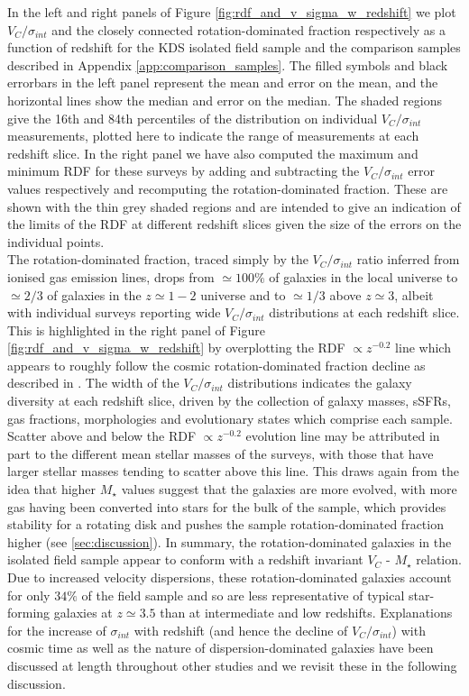 \documentclass[fleqn,usenatbib]{mn2e}
\begin{document}
In the left and right panels of Figure \ref{fig:rdf_and_v_sigma_w_redshift} we plot $V_{C}/\sigma_{int}$ and the closely connected rotation-dominated fraction respectively as a function of redshift for the KDS isolated field sample and the comparison samples described in Appendix \ref{app:comparison_samples}.
The filled symbols and black errorbars in the left panel represent the mean and error on the mean, and the horizontal lines show the median and error on the median.
The shaded regions give the 16th and 84th percentiles of the distribution on individual $V_{C}/\sigma_{int}$ measurements, plotted here to indicate the range of measurements at each redshift slice.
In the right panel we have also computed the maximum and minimum RDF for these surveys by adding and subtracting the $V_{C}/\sigma_{int}$ error values respectively and recomputing the rotation-dominated fraction.
These are shown with the thin grey shaded regions and are intended to give an indication of the limits of the RDF at different redshift slices given the size of the errors on the individual points.\\

The rotation-dominated fraction, traced simply by the $V_{C}/\sigma_{int}$ ratio inferred from ionised gas emission lines, drops from $\simeq100\%$ of galaxies in the local universe to $\simeq2/3$ of galaxies in the $z\simeq1-2$ universe and to $\simeq1/3$ above $z\simeq3$, albeit with individual surveys reporting wide $V_{C}/\sigma_{int}$ distributions at each redshift slice.
This is highlighted in the right panel of Figure \ref{fig:rdf_and_v_sigma_w_redshift} by overplotting the RDF $\propto z^{-0.2}$ line which appears to roughly follow the cosmic rotation-dominated fraction decline as described in \cite{Stott2016}. 
The width of the $V_{C}/\sigma_{int}$ distributions indicates the galaxy diversity at each redshift slice, driven by the collection of galaxy masses, sSFRs, gas fractions, morphologies and evolutionary states which comprise each sample.
Scatter above and below the RDF $\propto z^{-0.2}$ evolution line may be attributed in part to the different mean stellar masses of the surveys, with those that have larger stellar masses tending to scatter above this line.
This draws again from the idea that higher $M_{\star}$ values suggest that the galaxies are more evolved, with more gas having been converted into stars for the bulk of the sample, which provides stability for a rotating disk and pushes the sample rotation-dominated fraction higher (see \cref{sec:discussion}).
In summary, the rotation-dominated galaxies in the isolated field sample appear to conform with a redshift invariant $V_{C}$ - $M_{\star}$ relation.
Due to increased velocity dispersions, these rotation-dominated galaxies account for only $34\%$ of the field sample and so are less representative of typical star-forming galaxies at $z\simeq3.5$ than at intermediate and low redshifts. 
Explanations for the increase of $\sigma_{int}$ with redshift (and hence the decline of $V_{C}/\sigma_{int}$) with cosmic time as well as the nature of dispersion-dominated galaxies have been discussed at length throughout other studies \citep[e.g][]{ForsterSchreiber2009,Law2009,Burkert2010,Newman2013,Wisnioski2015} and we revisit these in the following discussion.
\end{document}
